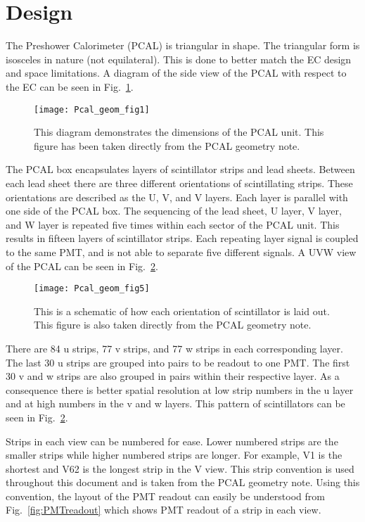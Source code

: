 \FloatBarrier
\section{Design}
The Preshower Calorimeter (PCAL) is triangular in shape. The triangular form is isosceles in nature (not equilateral). This is done 
to better match the EC design and space limitations. A diagram of the side view of the PCAL with respect to the EC can be seen in 
Fig.~\ref{fig:geomfig1}. 

\begin{figure}[h]
    \centering
    \texttt{[image: Pcal\_geom\_fig1]}
    \caption{This diagram demonstrates the dimensions of the PCAL unit. This figure has been taken directly from the PCAL 
    geometry note\cite{bib:geomnote}.}
    \label{fig:geomfig1}
\end{figure}

The PCAL box encapsulates layers of scintillator strips and lead sheets. Between each lead sheet there are three different 
orientations of scintillating strips. These orientations are described as the U, V, and V layers. Each layer is parallel 
with one side of the PCAL box. The sequencing of the lead sheet, U layer, V layer, and W layer is repeated five times within
each sector of the PCAL unit. This results in fifteen layers of scintillator strips. Each repeating layer signal is coupled 
to the same PMT, and  is not able to separate five different signals. A UVW view of the PCAL can be seen in Fig.~\ref{fig:geomfig5}.

\begin{figure}[h]
    \centering
    \texttt{[image: Pcal\_geom\_fig5]}
    \caption{This is a schematic of how each orientation of scintillator is laid out. This figure is also taken directly from
     the PCAL geometry note\cite{bib:geomnote}.}
    \label{fig:geomfig5}
\end{figure}
\FloatBarrier

\FloatBarrier
There are 84 u strips, 77 v strips, and 77 w strips in each corresponding layer. The last 30 u strips are grouped into pairs 
to be readout to one PMT. The first 30 v and w strips are also grouped in pairs within their respective layer. As a consequence 
there is better spatial resolution at low strip numbers in the u layer and at high numbers in the v and w layers. This pattern 
of scintillators can be seen in Fig.~\ref{fig:geomfig5}.

Strips in each view can be numbered for ease. Lower numbered strips are the smaller strips while higher numbered strips are longer.
For example, V1 is the shortest and V62 is the longest strip in the V view. This strip convention is used throughout this
document and is taken from the PCAL geometry note\cite{bib:geomnote}. Using this convention, the layout of the PMT readout 
can easily be understood from Fig.~\ref{fig:PMTreadout} which shows PMT readout of a strip in each view.

